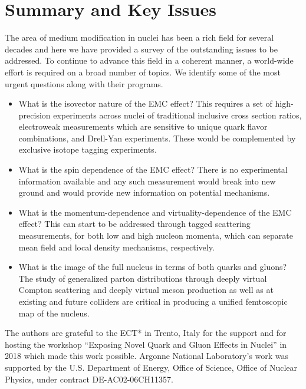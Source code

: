 \section{Summary and Key Issues\label{sec:conclusion}}
%
The area of medium modification in nuclei has been a rich field for several decades and here we have provided a survey of the outstanding issues to be addressed.  To continue to advance this field in a coherent manner, a world-wide effort is required on a broad number of topics.  We identify some of the most urgent questions along with their programs.

\begin{itemize}
    \item{What is the isovector nature of the EMC effect?  This requires a set of high-precision experiments across nuclei of traditional inclusive cross section ratios, electroweak measurements which are sensitive to unique quark flavor combinations, and Drell-Yan experiments.  These would be complemented by exclusive isotope tagging experiments.}
    \item{What is the spin dependence of the EMC effect?  There is no experimental information available and any such measurement would break into new ground and would provide new information on potential mechanisms.}
    \item{What is the momentum-dependence and virtuality-dependence of the EMC effect?  This can start to be addressed through tagged scattering measurements, for both low and high nucleon momenta, which can separate mean field and local density mechanisms, respectively.}
    \item{What is the image of the full nucleus in terms of both quarks and gluons?  The study of generalized parton distributions through deeply virtual Compton scattering and deeply virtual meson production as well as at existing and future colliders are critical in producing a unified femtoscopic map of the nucleus.}
\end{itemize}

\begin{acknowledgments}
The authors are grateful to the ECT* in Trento, Italy for the support and for hosting the workshop ``Exposing Novel Quark and Gluon Effects in Nuclei'' in 2018 which made this work possible.  Argonne National Laboratory's work was supported by the U.S. Department of Energy, Office of Science, Office of Nuclear Physics, under contract DE-AC02-06CH11357.  
\end{acknowledgments}
